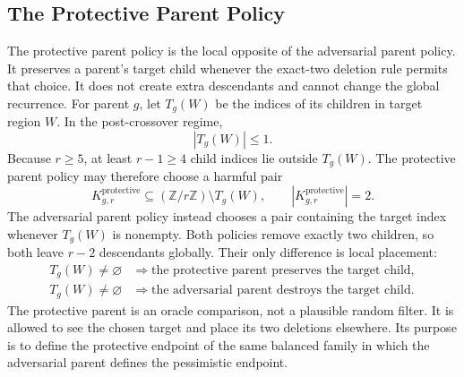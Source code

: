 \subsection{The Protective Parent Policy}
The protective parent policy is the local opposite of the adversarial parent policy. It preserves a parent's target child whenever the exact-two deletion rule permits that choice. It does not create extra descendants and cannot change the global recurrence.
For parent $g$, let $T_g(W)$ be the indices of its children in target region $W$. In the post-crossover regime,
\begin{equation*}
|T_g(W)|\le1.
\end{equation*}
Because $r\ge5$, at least $r-1\ge4$ child indices lie outside $T_g(W)$. The protective parent policy may therefore choose a harmful pair
\begin{equation*}
K_{g,r}^{\mathrm{protective}}
\subseteq
(\mathbb Z/r\mathbb Z)\setminus T_g(W),
\qquad
|K_{g,r}^{\mathrm{protective}}|=2.
\end{equation*}
The adversarial parent policy instead chooses a pair containing the target index whenever $T_g(W)$ is nonempty. Both policies remove exactly two children, so both leave $r-2$ descendants globally. Their only difference is local placement:
\begin{equation*}
\begin{aligned}
T_g(W)\ne\varnothing
&\Longrightarrow
\text{the protective parent preserves the target child},\\
T_g(W)\ne\varnothing
&\Longrightarrow
\text{the adversarial parent destroys the target child}.
\end{aligned}
\end{equation*}
The protective parent is an oracle comparison, not a plausible random filter. It is allowed to see the chosen target and place its two deletions elsewhere. Its purpose is to define the protective endpoint of the same balanced family in which the adversarial parent defines the pessimistic endpoint.
